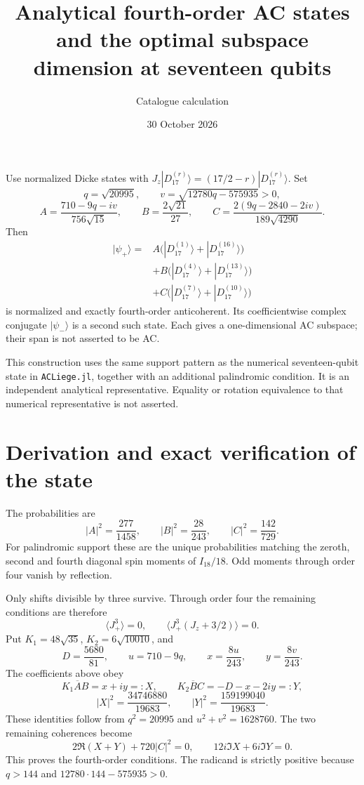 \documentclass[11pt]{article}
\begin{document}
\title{Analytical fourth-order AC states and the optimal subspace dimension at seventeen qubits}
\author{Catalogue calculation}
\date{30 October 2026}
\maketitle

Use normalized Dicke states with
$J_z|D_{17}^{(r)}\rangle=(17/2-r)|D_{17}^{(r)}\rangle$.
Set
\[
 q=\sqrt{20995},\qquad v=\sqrt{12780q-575935}>0,
\]
\[
 A=\frac{710-9q-iv}{756\sqrt{15}},\qquad
 B=\frac{2\sqrt{21}}{27},\qquad
 C=\frac{2(9q-2840-2iv)}{189\sqrt{4290}}.
\]
Then
\begin{align*}
 |\psi_+\rangle={}&A\bigl(|D_{17}^{(1)}\rangle+|D_{17}^{(16)}\rangle\bigr)\\
 &+B\bigl(|D_{17}^{(4)}\rangle+|D_{17}^{(13)}\rangle\bigr)\\
 &+C\bigl(|D_{17}^{(7)}\rangle+|D_{17}^{(10)}\rangle\bigr)
\end{align*}
is normalized and exactly fourth-order anticoherent. Its coefficientwise
complex conjugate $|\psi_-\rangle$ is a second such state. Each gives a
one-dimensional AC subspace; their span is not asserted to be AC.

This construction uses the same support pattern as the numerical seventeen-qubit
state in \texttt{ACLiege.jl}, together with an additional palindromic condition.
It is an independent analytical representative. Equality or rotation equivalence
to that numerical representative is not asserted.

\section{Derivation and exact verification of the state}
The probabilities are
\[
 |A|^2=\frac{277}{1458},\qquad |B|^2=\frac{28}{243},\qquad
 |C|^2=\frac{142}{729}.
\]
For palindromic support these are the unique probabilities matching the
zeroth, second and fourth diagonal spin moments of $I_{18}/18$.
Odd moments through order four vanish by reflection.

Only shifts divisible by three survive. Through order four the remaining
conditions are therefore
\[
 \langle J_+^3\rangle=0,\qquad
 \langle J_+^3(J_z+3/2)\rangle=0.
\]
Put $K_1=48\sqrt{35}$, $K_2=6\sqrt{10010}$, and
\[
 D=\frac{5680}{81},\qquad
 u=710-9q,\qquad x=\frac{8u}{243},\qquad y=\frac{8v}{243}.
\]
The coefficients above obey
\[
 K_1\overline A B=x+iy=:X,\qquad
 K_2\overline B C=-D-x-2iy=:Y,
\]
\[
 |X|^2=\frac{34746880}{19683},\qquad
 |Y|^2=\frac{159199040}{19683}.
\]
These identities follow from $q^2=20995$ and $u^2+v^2=1628760$.
The two remaining coherences become
\[
 2\Re(X+Y)+720|C|^2=0,\qquad
 12i\Im X+6i\Im Y=0.
\]
This proves the fourth-order conditions. The radicand is strictly positive
because $q>144$ and $12780\cdot144-575935>0$.
\end{document}
